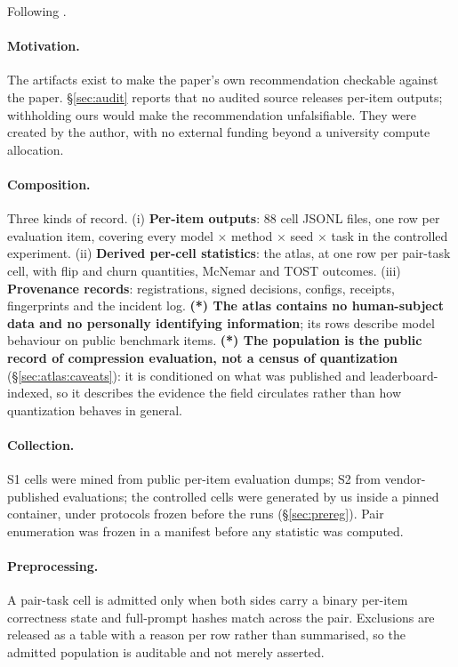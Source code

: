 Following \citet{gebru2021datasheets}.

\paragraph{Motivation.} The artifacts exist to make the paper's own
recommendation checkable against the paper. \S\ref{sec:audit} reports that no
audited source releases per-item outputs; withholding ours would make the
recommendation unfalsifiable. They were created by the author, with no external
funding beyond a university compute allocation.

\paragraph{Composition.} Three kinds of record. (i) \textbf{Per-item outputs}:
88 cell JSONL files, one row per evaluation item, covering every model $\times$
method $\times$ seed $\times$ task in the controlled experiment. (ii)
\textbf{Derived per-cell statistics}: the atlas, at one row per pair-task cell,
with flip and churn quantities, McNemar and TOST outcomes. (iii)
\textbf{Provenance records}: registrations, signed decisions, configs, receipts,
fingerprints and the incident log. \textbf{(*) The atlas contains no
human-subject data and no personally identifying information}; its rows describe
model behaviour on public benchmark items. \textbf{(*) The population is the
public record of compression evaluation, not a census of quantization}
(\S\ref{sec:atlas:caveats}): it is conditioned on what was published and
leaderboard-indexed, so it describes the evidence the field circulates rather
than how quantization behaves in general.

\paragraph{Collection.} S1 cells were mined from public per-item evaluation
dumps; S2 from vendor-published evaluations; the controlled cells were generated
by us inside a pinned container, under protocols frozen before the runs
(\S\ref{sec:prereg}). Pair enumeration was frozen in a manifest before any
statistic was computed.

\paragraph{Preprocessing.} A pair-task cell is admitted only when both sides
carry a binary per-item correctness state and full-prompt hashes match across the
pair. Exclusions are released as a table with a reason per row rather than
summarised, so the admitted population is auditable and not merely asserted.

